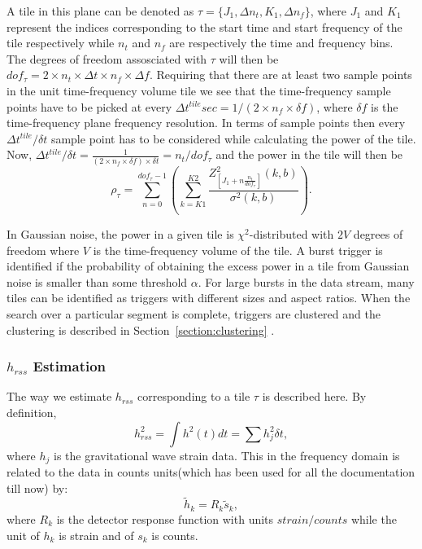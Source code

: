 A tile in this plane can be denoted as $\tau =\{J_1, \Delta n_t, K_1, \Delta n_f\}$,  where
$J_1$ and $K_1$ represent the indices corresponding to the start time and 
start frequency of the tile respectively while $n_t$ and $n_f$ are respectively the
time and frequency bins.  The degrees of freedom assosciated with
$\tau$ will then be $dof_{\tau} = 2 \times n_t \times \Delta t \times n_f \times \Delta f $.
  Requiring that there are at least two sample points in the unit time-frequency volume tile 
we see that the time-frequency sample points have to be picked at every 
$\Delta t^{tile} sec = 1 / (2 \times n_f \times \delta f)$,  where $\delta f$ is the time-frequency 
plane frequency resolution.  In terms of sample points then every $\Delta t^{tile} / \delta t $ sample point 
has to be considered while calculating the power of the tile.  Now,  
$\Delta t^{tile} / \delta t = \frac{1}{(2 \times n_f \times \delta f) \times \delta t} = n_t / dof_{\tau}$  
and the power in the tile will then be 
\begin{equation}
\rho_{\tau} = \sum_{n=0}^{dof_{\tau}-1}(\sum_{k=K1}^{K2}\frac{Z^2_{[J_1 + n\frac{n_t}{dof_{\tau}}]}(k,b)}{\sigma^2(k,b)}).
\end{equation}

In Gaussian noise,  the power in a given tile is $\chi^2$-distributed
with $2 V$ degrees of freedom where $V$ is the time-frequency volume
of the tile.    A burst trigger is identified if the probability of
obtaining the excess power in a tile from Gaussian noise is smaller
than some threshold $\alpha$.   For large bursts in the data stream,
many tiles can be identified as triggers with different sizes and
aspect ratios.   When the search over a particular segment is
complete,   triggers are clustered and the clustering is described in 
Section~\ref{section:clustering} .

\subsubsection{$h_{rss}$ Estimation}
The way we estimate $h_{rss}$ corresponding to a tile $\tau$ is described 
here.  By definition,
\begin{equation}
h_{rss}^2 =  \int h^2(t)dt = \sum h^2_j \delta t,
\end{equation}
where $h_j$ is the gravitational wave strain data. This in the 
frequency domain is related to 
the data in counts units(which has been used for all the documentation 
till now) by: 
\begin{equation}
\tilde h_k = R_k \tilde s_k,
\end{equation}  
where $R_k$ is the detector response function with units $strain / counts$ 
while the unit of $h_k$ is strain and of $s_k$ is counts.
  
